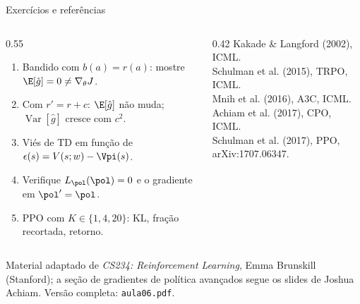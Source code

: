 \documentclass[aspectratio=169, 11pt]{beamer}
\newcommand{\ghat}{\hat{g}}
\newcommand{\Var}{\operatorname{Var}}
\begin{document}
\begin{frame}{Exercícios e referências}
  \begin{columns}[T]
    \begin{column}{0.55\textwidth}
      \begin{enumerate}\footnotesize\setlength{\itemsep}{0.2em}
        \item Bandido com $b(a) = r(a)$: mostre $\E[\ghat] = 0 \neq \nabla_\theta J$.
        \item Com $r' = r + c$: $\E[\ghat]$ não muda; $\Var[\ghat]$ cresce com $c^2$.
        \item Viés de TD em função de $\epsilon(s) = V(s;w) - \Vpi(s)$.
        \item Verifique $L_{\pol}(\pol) = 0$ e o gradiente em $\pol'=\pol$.
        \item PPO com $K\in\{1,4,20\}$: KL, fração recortada, retorno.
      \end{enumerate}
    \end{column}
    \begin{column}{0.42\textwidth}
      \footnotesize
      Kakade \& Langford (2002), ICML.\\
      Schulman et al. (2015), TRPO, ICML.\\
      Mnih et al. (2016), A3C, ICML.\\
      Achiam et al. (2017), CPO, ICML.\\
      Schulman et al. (2017), PPO, arXiv:1707.06347.
    \end{column}
  \end{columns}

  \vfill
  {\footnotesize\color{rlCinza}Material adaptado de \emph{CS234: Reinforcement Learning}, Emma Brunskill
  (Stanford); a seção de gradientes de política avançados segue os slides de Joshua Achiam.
  Versão completa: \texttt{aula06.pdf}.}
\end{frame}
\end{document}
